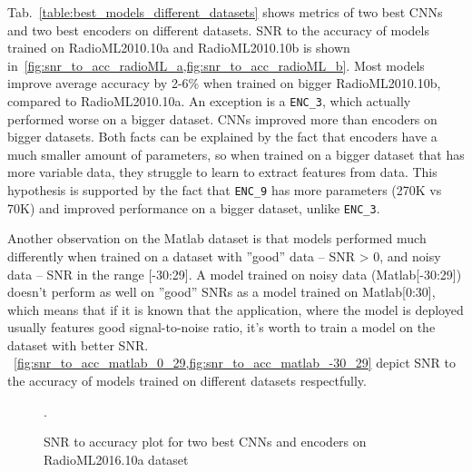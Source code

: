 Tab.~\ref{table:best_models_different_datasets} shows metrics of two best CNNs and two best encoders on different datasets. SNR to the accuracy of models trained on RadioML2010.10a and RadioML2010.10b is shown in~\cref{fig:snr_to_acc_radioML_a,fig:snr_to_acc_radioML_b}. Most models improve average accuracy by 2-6\% when trained on bigger RadioML2010.10b, compared to  RadioML2010.10a. An exception is a \verb|ENC_3|, which actually performed worse on a bigger dataset. CNNs improved more than encoders on bigger datasets. Both facts can be explained by the fact that encoders have a much smaller amount of parameters, so when trained on a bigger dataset that has more variable data, they struggle to learn to extract features from data. This hypothesis is supported by the fact that \verb|ENC_9| has more parameters (270K vs 70K) and improved performance on a bigger dataset, unlike \verb|ENC_3|.

Another observation on the Matlab dataset is that models performed much differently when trained on a dataset with ''good'' data -- SNR > 0, and noisy data -- SNR in the range [-30:29]. A model trained on noisy data (Matlab[-30:29]) doesn't perform as well on ''good'' SNRs as a model trained on Matlab[0:30], which means that if it is known that the application, where the model is deployed usually features good signal-to-noise ratio, it's worth to train a model on the dataset with better SNR. ~\cref{fig:snr_to_acc_matlab_0_29,fig:snr_to_acc_matlab_-30_29} depict SNR to the accuracy of models trained on different datasets respectfully.


\begin{figure}[h!]
    \begin{center}
        
    \end{center}
    \caption{SNR to accuracy plot for two best CNNs and encoders on RadioML2016.10a dataset}.
    \label{fig:snr_to_acc_radioML_a}
\end{figure}


